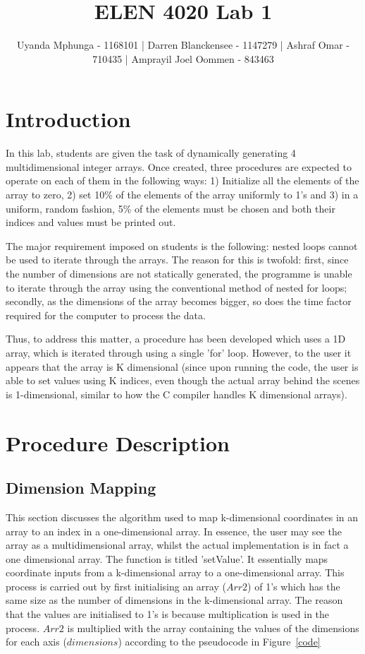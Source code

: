 \documentclass[journal, a4paper]{IEEEtran}
\begin{document}
	\title{ELEN 4020 Lab 1}

	\author{\small Uyanda Mphunga - 1168101 | Darren Blanckensee - 1147279 | 
Ashraf Omar - 710435 | Amprayil Joel Oommen - 843463}

	\maketitle

\section{Introduction}
In this lab, students are given the task of dynamically generating 4 multidimensional integer arrays. Once created, three procedures are expected to operate on each of them in the following ways:
1) Initialize all the elements of the array to zero,
2) set 10\% of the elements of the array uniformly to 1’s and
3) in a uniform, random fashion, 5\% of the elements must be chosen and both their indices and values must be printed out. \newline

The major requirement imposed on students is the following: nested loops cannot be used to iterate through the arrays. The reason for this is twofold: first, since the number of dimensions are not statically generated, the programme is unable to iterate through the array using the conventional method of nested for loops; secondly, as the dimensions of the array becomes bigger, so does the time factor required for the computer to process the data. \newline

Thus, to address this matter, a procedure has been developed which uses a 1D array, which is iterated through using a single 'for' loop. However, to the user it appears that the array is K dimensional (since upon running the code, the user is able to set values using K indices, even though the actual array behind the scenes is 1-dimensional, similar to how the C compiler handles K dimensional arrays).


\section{Procedure Description}
\subsection{Dimension Mapping}
This section discusses the algorithm used to map k-dimensional coordinates in an array to an index in a one-dimensional array. In essence, the user may see the array as a multidimensional array, whilst the actual implementation is in fact a one dimensional array. The function is titled 'setValue'. It essentially maps coordinate inputs from a k-dimensional array to a one-dimensional array. This process is carried out by first initialising an array ($Arr2$) of 1's which has the same size as the number of dimensions in the k-dimensional array. The reason that the values are initialised to 1's is because multiplication is used in the process. $Arr2$ is multiplied with the array containing the values of the dimensions for each axis ($dimensions$) according to the pseudocode in Figure~\ref{code}
\end{document}
